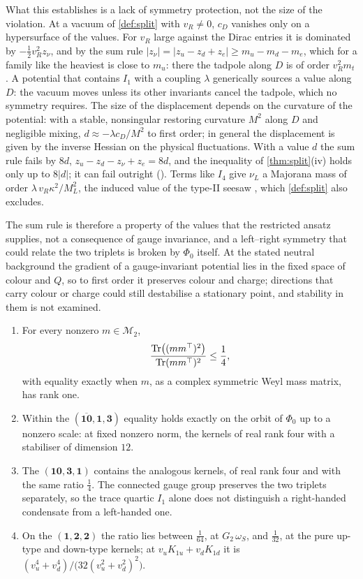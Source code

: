 What this establishes is a lack of symmetry protection, not the size of the violation. At a vacuum of \cref{def:split} with $v_R\ne0$, $c_D$
vanishes only on a hypersurface of the values. For $v_R$ large against the Dirac entries it is dominated by $-\tfrac12v_R^2z_\nu$, and by the
sum rule $|z_\nu|=|z_u-z_d+z_e|\ge m_u-m_d-m_e$, which for a family like the heaviest is close to $m_u$: there the tadpole along $D$ is of
order $v_R^2m_t$. A potential that contains $I_1$ with a coupling $\lambda$ generically sources a value along $D$: the vacuum moves unless its other
invariants cancel the tadpole, which no symmetry requires. The size of the displacement depends on the curvature of the potential: with a stable, nonsingular
restoring curvature $M^2$ along $D$ and negligible mixing, $d\approx-\lambda c_D/M^2$ to first order; in general the displacement is given by
the inverse Hessian on the physical fluctuations. With a value $d$ the sum rule fails by $8d$, $z_u-z_d-z_\nu+z_e=8d$, and the inequality of
\cref{thm:split}(iv) holds only up to $8|d|$; it can fail outright (). Terms like $I_4$ give $\nu_L$ a Majorana mass of order
$\lambda\,v_R\kappa^2/M_L^2$, the induced value of the type-II seesaw \cite{MohapatraSenjanovic81}, which \cref{def:split} also excludes.

The sum rule is therefore a property of the values that the restricted ansatz supplies, not a consequence of gauge invariance, and a
left--right symmetry that could relate the two triplets is broken by $\Phi_0$ itself. At the stated neutral background the gradient of a gauge-invariant potential lies in the
fixed space of colour and $Q$, so to first order it preserves colour and charge; directions that carry colour or charge could still
destabilise a stationary point, and stability in them is not examined.

\begin{proposition}
\label{prop:select}
\begin{enumerate}[label=(\roman*),leftmargin=2.2em,itemsep=1pt]
\item For every nonzero $m\in\mathcal M_2$,
\[
\frac{\operatorname{Tr}\bigl((mm^\top)^2\bigr)}{\operatorname{Tr}(mm^\top)^2}\le\frac14 ,
\]
with equality exactly when $m$, as a complex symmetric Weyl mass matrix, has rank one.
\item Within the $(\overline{\mathbf{10}},\mathbf1,\mathbf3)$ equality holds exactly on the orbit of $\Phi_0$ up to a nonzero scale: at fixed
nonzero norm, the kernels of real rank four with a stabiliser of dimension $12$.
\item The $(\mathbf{10},\mathbf3,\mathbf1)$ contains the analogous kernels, of real rank four and with the same ratio $\tfrac14$. The connected
gauge group preserves the two triplets separately, so the trace quartic $I_1$ alone does not distinguish a right-handed condensate from a
left-handed one.
\item On the $(\mathbf1,\mathbf2,\mathbf2)$ the ratio lies between $\tfrac1{64}$, at $G_2\,\omega_S$, and $\tfrac1{32}$, at the pure up-type
and down-type kernels; at $v_uK_{1u}+v_dK_{1d}$ it is $(v_u^4+v_d^4)/\bigl(32(v_u^2+v_d^2)^2\bigr)$.
\end{enumerate}
\end{proposition}

